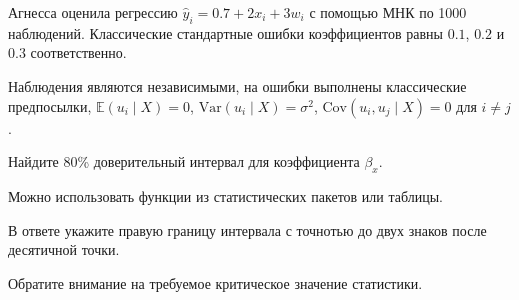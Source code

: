 
\begin{question}
Агнесса оценила регрессию \(\hat y_i = 0.7 + 2x_i + 3w_i\) с помощью МНК по 1000 наблюдений.
Классические стандартные ошибки коэффициентов равны \(0.1\), \(0.2\) и \(0.3\) соответственно.

Наблюдения являются независимыми, на ошибки выполнены классические предпосылки, \(\mathbb E(u_i \mid X) = 0\), \(\mathrm{Var}(u_i \mid X) = \sigma^2\),
\(\mathrm{Cov}(u_i, u_j \mid X) = 0\) для \(i\neq j\).

Найдите 80\% доверительный интервал для коэффициента \(\beta_x\).

Можно использовать функции из статистических пакетов или таблицы.

В ответе укажите правую границу интервала с точнотью до двух знаков после десятичной точки.
\end{question}

\begin{solution}
Обратите внимание на требуемое критическое значение статистики.
\end{solution}

